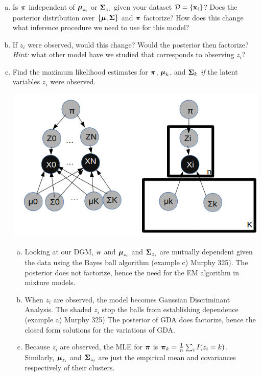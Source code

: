 \documentclass[12pt,letterpaper,fleqn]{hmcpset}
\begin{document}
\begin{enumerate}[(a)]
    \item Is $\hbox{\boldmath$\pi$}$ independent of $\hbox{\boldmath$\mu$}_{z_i}$ or $\hbox{\boldmath$\Sigma$}_{z_i}$ given
        your dataset ${\cal D} = \{{\bf x}_i\}$? Does the posterior distribution over
        $\{\hbox{\boldmath$\mu$},\hbox{\boldmath$\Sigma$}\}$ and $\hbox{\boldmath$\pi$}$ factorize? How does this change what inference
        procedure we need to use for this model?
    \item If $z_i$ were observed, would this change? Would the posterior then
        factorize? \textit{Hint:} what other model have we studied that corresponds to
        observing $z_i$?
    \item Find the maximum likelihood estimates for $\hbox{\boldmath$\pi$}$, $\hbox{\boldmath$\mu$}_k$, and $\hbox{\boldmath$\Sigma$}_k$
        \textit{if} the latent variables $z_i$ were observed.\\

\begin{solution}

    \includegraphics[scale = .5]{p1.png}
    \begin{enumerate}[(a)]
        \item 
            Looking at our DGM, $\hbox{\boldmath$\pi$}$ and $\hbox{\boldmath$\mu$}_{z_i}$ and $\hbox{\boldmath$\Sigma$}_{z_i}$ are mutually dependent given the data using the Bayes ball algorithm (example c) Murphy 325). The posterior does not factorize, hence the need for the EM algorithm in mixture models.
        \item 
            When $z_i$ are observed, the model becomes Gaussian Discriminant Analysis. The shaded $z_i$ stop the balls from establishing dependence (example a) Murphy 325) The posterior of GDA does factorize, hence the closed form solutions for the variations of GDA.
        \item
            Because $z_i$ are observed, the MLE for $\hbox{\boldmath$\pi$}$ is $\hbox{\boldmath$\pi$}_k = \frac{1}{n}\sum_i I(z_i = k)$. Similarly, $\hbox{\boldmath$\mu$}_{z_i}$ and $\hbox{\boldmath$\Sigma$}_{z_i}$ are just the empirical mean and covariances respectively of their clusters.

    \end{enumerate}
\end{solution}
\end{enumerate}
\newpage
\end{document}
